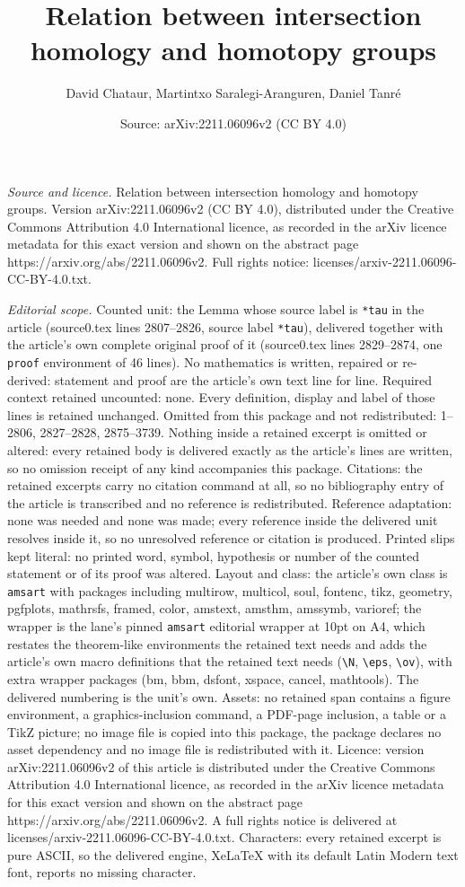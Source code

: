 \documentclass[10pt,a4paper]{amsart}
\title[Relation between intersection homology and homotopy groups]{Relation between intersection homology and homotopy groups}
\author{David Chataur, Martintxo Saralegi-Aranguren, Daniel Tanr\'e}
\date{Source: arXiv:2211.06096v2 (CC BY 4.0)}
\begin{document}
\maketitle

\noindent\emph{Source and licence.} Relation between intersection homology and homotopy groups. Version arXiv:2211.06096v2 (CC BY 4.0), distributed under the Creative Commons Attribution 4.0 International licence, as recorded in the arXiv licence metadata for this exact version and shown on the abstract page https://arxiv.org/abs/2211.06096v2. Full rights notice: licenses/arxiv-2211.06096-CC-BY-4.0.txt.\par\smallskip

\noindent\textit{Editorial scope.} Counted unit: the Lemma whose source label is \texttt{*tau} in the article (source0.tex lines 2807--2826, source label \texttt{*tau}), delivered together with the article's own complete original proof of it (source0.tex lines 2829--2874, one \texttt{proof} environment of 46 lines). No mathematics is written, repaired or re-derived: statement and proof are the article's own text line for line. Required context retained uncounted: none. Every definition, display and label of those lines is retained unchanged. Omitted from this package and not redistributed: 1--2806, 2827--2828, 2875--3739. Nothing inside a retained excerpt is omitted or altered: every retained body is delivered exactly as the article's lines are written, so no omission receipt of any kind accompanies this package. Citations: the retained excerpts carry no citation command at all, so no bibliography entry of the article is transcribed and no reference is redistributed. Reference adaptation: none was needed and none was made; every reference inside the delivered unit resolves inside it, so no unresolved reference or citation is produced. Printed slips kept literal: no printed word, symbol, hypothesis or number of the counted statement or of its proof was altered. Layout and class: the article's own class is \texttt{amsart} with packages including multirow, multicol, soul, fontenc, tikz, geometry, pgfplots, mathrsfs, framed, color, amstext, amsthm, amssymb, varioref; the wrapper is the lane's pinned \texttt{amsart} editorial wrapper at 10pt on A4, which restates the theorem-like environments the retained text needs and adds the article's own macro definitions that the retained text needs (\texttt{\textbackslash N}, \texttt{\textbackslash eps}, \texttt{\textbackslash ov}), with extra wrapper packages (bm, bbm, dsfont, xspace, cancel, mathtools). The delivered numbering is the unit's own. Assets: no retained span contains a figure environment, a graphics-inclusion command, a PDF-page inclusion, a table or a TikZ picture; no image file is copied into this package, the package declares no asset dependency and no image file is redistributed with it. Licence: version arXiv:2211.06096v2 of this article is distributed under the Creative Commons Attribution 4.0 International licence, as recorded in the arXiv licence metadata for this exact version and shown on the abstract page https://arxiv.org/abs/2211.06096v2. A full rights notice is delivered at licenses/arxiv-2211.06096-CC-BY-4.0.txt. Characters: every retained excerpt is pure ASCII, so the delivered engine, XeLaTeX with its default Latin Modern text font, reports no missing character.
\end{document}
